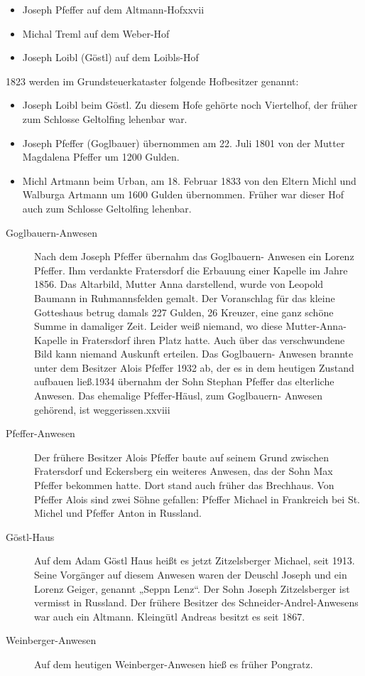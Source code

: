 \documentclass{book}
\begin{document}
\begin{itemize}
\item Joseph Pfeffer auf dem Altmann-Hofxxvii

\item Michal Treml auf dem Weber-Hof

\item Joseph Loibl (Göstl) auf dem Loibls-Hof
\end{itemize}

1823 werden im Grundsteuerkataster folgende Hofbesitzer genannt:

\begin{itemize}
\item Joseph Loibl beim Göstl. Zu diesem Hofe gehörte noch Viertelhof,
der früher zum Schlosse Geltolfing lehenbar war.

\item Joseph Pfeffer (Goglbauer) übernommen am 22. Juli 1801 von der
Mutter Magdalena Pfeffer um 1200 Gulden.

\item Michl Artmann beim Urban, am 18. Februar 1833 von den Eltern Michl
und Walburga Artmann um 1600 Gulden übernommen. Früher war dieser Hof
auch zum Schlosse Geltolfing lehenbar.
\end{itemize}

\begin{description}
\item[Goglbauern-Anwesen] Nach dem Joseph Pfeffer übernahm das
Goglbauern- Anwesen ein Lorenz Pfeffer. Ihm verdankte Fratersdorf die
Erbauung einer Kapelle im Jahre 1856. Das Altarbild, Mutter Anna
darstellend, wurde von Leopold Baumann in Ruhmannsfelden gemalt. Der
Voranschlag für das kleine Gotteshaus betrug damals 227 Gulden, 26
Kreuzer, eine ganz schöne Summe in damaliger Zeit. Leider weiß niemand,
wo diese Mutter-Anna-Kapelle in Fratersdorf ihren Platz hatte. Auch über
das verschwundene Bild kann niemand Auskunft erteilen. Das Goglbauern-
Anwesen brannte unter dem Besitzer Alois Pfeffer 1932 ab, der es in dem
heutigen Zustand aufbauen ließ.1934 übernahm der Sohn Stephan Pfeffer
das elterliche Anwesen. Das ehemalige Pfeffer-Häusl, zum Goglbauern-
Anwesen gehörend, ist weggerissen.xxviii

\item[Pfeffer-Anwesen] Der frühere Besitzer Alois Pfeffer baute auf
seinem Grund zwischen Fratersdorf und Eckersberg ein weiteres Anwesen,
das der Sohn Max Pfeffer bekommen hatte. Dort stand auch früher das
Brechhaus. Von Pfeffer Alois sind zwei Söhne gefallen: Pfeffer Michael
in Frankreich bei St. Michel und Pfeffer Anton in Russland.

\item[Göstl-Haus] Auf dem Adam Göstl Haus heißt es jetzt Zitzelsberger
Michael, seit 1913. Seine Vorgänger auf diesem Anwesen waren der Deuschl
Joseph und ein Lorenz Geiger, genannt „Seppn Lenz“. Der Sohn Joseph
Zitzelsberger ist vermisst in Russland. Der frühere Besitzer des
Schneider-Andrel-Anwesens war auch ein Altmann. Kleingütl Andreas
besitzt es seit 1867.

\item[Weinberger-Anwesen] Auf dem heutigen Weinberger-Anwesen hieß es
früher Pongratz.
\end{description}
\end{document}
